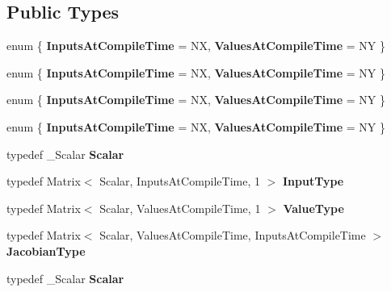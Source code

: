 \subsection*{Public Types}
\begin{DoxyCompactItemize}
\item 
\mbox{\label{struct_functor_a783d2e424d572036dc9983eac169b306}} 
enum \{ {\bfseries Inputs\+At\+Compile\+Time} = NX, 
{\bfseries Values\+At\+Compile\+Time} = NY
 \}
\item 
\mbox{\label{struct_functor_aae87ff581dfe5377c3d165cc5731f57c}} 
enum \{ {\bfseries Inputs\+At\+Compile\+Time} = NX, 
{\bfseries Values\+At\+Compile\+Time} = NY
 \}
\item 
\mbox{\label{struct_functor_a4cad39d2ccc724c6d0d8155c1f3d6d87}} 
enum \{ {\bfseries Inputs\+At\+Compile\+Time} = NX, 
{\bfseries Values\+At\+Compile\+Time} = NY
 \}
\item 
\mbox{\label{struct_functor_aa2dd469f1042c122e69bb76f8a77d87b}} 
enum \{ {\bfseries Inputs\+At\+Compile\+Time} = NX, 
{\bfseries Values\+At\+Compile\+Time} = NY
 \}
\item 
\mbox{\label{struct_functor_a9690bcfe4a9698846510bcc449194c6a}} 
typedef \+\_\+\+Scalar {\bfseries Scalar}
\item 
\mbox{\label{struct_functor_a31735f0c889a1cb1aabacd873dc9633d}} 
typedef Matrix$<$ Scalar, Inputs\+At\+Compile\+Time, 1 $>$ {\bfseries Input\+Type}
\item 
\mbox{\label{struct_functor_a45facfd3140f9f185fe3b64347ef250c}} 
typedef Matrix$<$ Scalar, Values\+At\+Compile\+Time, 1 $>$ {\bfseries Value\+Type}
\item 
\mbox{\label{struct_functor_aaa52be4c1b359195253672350664bc92}} 
typedef Matrix$<$ Scalar, Values\+At\+Compile\+Time, Inputs\+At\+Compile\+Time $>$ {\bfseries Jacobian\+Type}
\item 
\mbox{\label{struct_functor_a9690bcfe4a9698846510bcc449194c6a}} 
typedef \+\_\+\+Scalar {\bfseries Scalar}
\item 

\end{DoxyCompactItemize}
